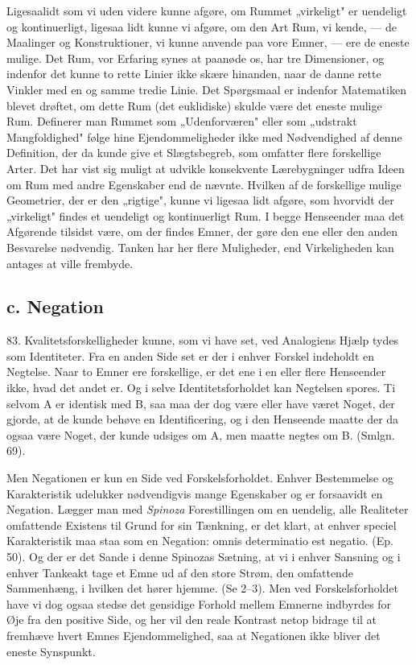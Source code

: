 \documentclass[12pt,a4paper]{book}
\newcommand{\apage}[1]{\marginnote{\footnotesize\textit{[#1]}}}
\begin{document}
Ligesaalidt som vi uden videre kunne afgøre, om Rummet „virkeligt" er uendeligt
og kontinuerligt, ligesaa lidt kunne vi afgøre, om den Art Rum, vi kende, --- de
Maalinger og Konstruktioner, vi kunne anvende paa vore Emner, --- ere de eneste
mulige. Det Rum, vor Erfaring synes at paanøde os, har tre Dimensioner, og
indenfor det kunne to rette Linier ikke skære hinanden, naar de danne rette
Vinkler med en og samme tredie Linie. Det Spørgsmaal er indenfor Matematiken
blevet drøftet, om dette Rum (det euklidiske) skulde være det eneste mulige Rum.
Definerer man Rummet som „Udenforværen" eller som „udstrakt Mangfoldighed" følge
hine Ejendommeligheder ikke med Nødvendighed af denne Definition, der da kunde
give et Slægtsbegreb, som omfatter flere forskellige Arter. Det har vist sig
muligt at udvikle konsekvente Lærebygninger udfra Ideen om Rum med andre
Egenskaber end de nævnte. Hvilken af de forskellige mulige Geometrier, der er den
„rigtige", kunne vi ligesaa lidt afgøre, som hvorvidt der „virkeligt" findes et
uendeligt og kontinuerligt Rum. I begge Henseender maa det Afgørende tilsidst
være, om der findes Emner, der gøre den ene eller den anden Besvarelse nødvendig.
Tanken har her flere Muligheder, end Virkeligheden kan antages at ville frembyde.

\subsection*{c. Negation}

83. Kvalitetsforskelligheder kunne, som vi have set, ved Analogiens Hjælp tydes
som Identiteter. Fra en anden Side set er der i enhver Forskel indeholdt en
Negtelse. Naar to Emner ere forskellige, er det ene i en eller flere Henseender
ikke, hvad det andet er. Og i selve Identitetsforholdet \apage{202} kan Negtelsen spores. Ti
selvom A er identisk med B, saa maa der dog være eller have været Noget, der
gjorde, at de kunde behøve en Identificering, og i den Henseende maatte der da
ogsaa være Noget, der kunde udsiges om A, men maatte negtes om B. (Smlgn. 69).

Men Negationen er kun en Side ved Forskelsforholdet. Enhver Bestemmelse og
Karakteristik udelukker nødvendigvis mange Egenskaber og er forsaavidt en
Negation. Lægger man med \emph{Spinoza} Forestillingen om en uendelig, alle
Realiteter omfattende Existens til Grund for sin Tænkning, er det klart, at
enhver speciel Karakteristik maa staa som en Negation: omnis determinatio est
negatio. (Ep. 50). Og der er det Sande i denne Spinozas Sætning, at vi i enhver
Sansning og i enhver Tankeakt tage et Emne ud af den store Strøm, den omfattende
Sammenhæng, i hvilken det hører hjemme. (Se 2--3). Men ved Forskelsforholdet have
vi dog ogsaa stedse det gensidige Forhold mellem Emnerne indbyrdes for Øje fra
den positive Side, og her vil den reale Kontrast netop bidrage til at fremhæve
hvert Emnes Ejendommelighed, saa at Negationen ikke bliver det eneste Synspunkt.
\end{document}
